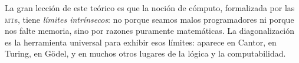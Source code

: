 \documentclass[11pt,a4paper]{article}
\theoremstyle{definicion}
\newcommand{\MTs}{\textsc{mt}s}
\begin{document}
\begin{intuicion}
La gran lección de este teórico es que la noción de cómputo, formalizada por las \MTs, tiene \emph{límites intrínsecos}: no porque seamos malos programadores ni porque nos falte memoria, sino por razones puramente matemáticas. La diagonalización es la herramienta universal para exhibir esos límites: aparece en Cantor, en Turing, en Gödel, y en muchos otros lugares de la lógica y la computabilidad.
\end{intuicion}
\end{document}
